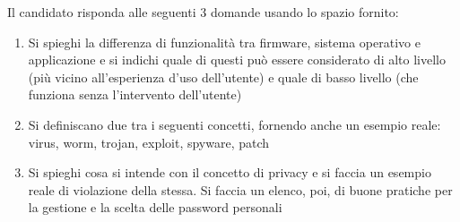 \documentclass[addpoints]{exam}
\begin{document}
	
\begin{center}
\end{center}

\vspace{5mm}


\vspace{10mm}

Il candidato risponda alle seguenti 3 domande usando lo spazio fornito:\\
\begin{enumerate}
	\item Si spieghi la differenza di funzionalità tra firmware, sistema operativo e applicazione e si indichi quale di questi può essere considerato di alto livello (più vicino all’esperienza d’uso dell’utente) e quale di basso livello (che funziona senza l’intervento dell’utente) \fillwithlines{2in}
	
	\item Si definiscano due tra i seguenti concetti, fornendo anche un esempio reale: virus, worm, trojan, exploit, spyware, patch\fillwithlines{2in}
	
	\item Si spieghi cosa si intende con il concetto di privacy e si faccia un esempio reale di violazione della stessa. Si faccia un elenco, poi, di buone pratiche per la gestione e la scelta delle password personali \fillwithlines{2in}
\end{enumerate}
\end{document}
